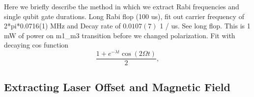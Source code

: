 \documentclass[12pt]{report}
\begin{document}
    Here we briefly describe the method in which we extract Rabi frequencies and single qubit gate durations.
    Long Rabi flop (100 us), fit out carrier frequency of 2*pi*0.0716(1) MHz and
    Decay rate of $0.0107(7)$ 1 / us. See long flop. This is 1 mW of power on m1\_m3
    transition before we changed polarization. Fit with decaying cos function 
    \begin{equation}
        \frac{1 + e^{-\lambda t} \cos(2 \Omega t)}{2},
    \end{equation}

\subsection{Extracting Laser Offset and Magnetic Field}
\label{sec:Laser Offset}
\end{document}
